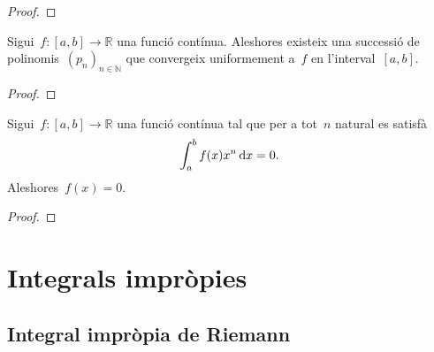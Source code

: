 \documentclass[../../main.tex]{subfiles}
\begin{document}
    \begin{proof}
    \end{proof}
    \begin{theorem}
        \label{thm:Teorema-daproximacio-polinomica-de-Weierstrass}
        Sigui~\(f\colon[a,b]\longrightarrow\mathbb{R}\) una funció contínua.
        Aleshores existeix una successió de polinomis~\((p_{n})_{n\in\mathbb{N}}\) que convergeix uniformement a~\(f\) en l'interval~\([a,b]\).
    \end{theorem}
    \begin{proof}
    \end{proof}
    \begin{corollary}
        Sigui~\(f\colon[a,b]\longrightarrow\mathbb{R}\) una funció contínua tal que per a tot~\(n\) natural es satisfà
        \[
            \int_{a}^{b}f(x)x^{n}\mathop{}\!\mathrm{d} x=0.
        \]
        Aleshores~\(f(x)=0\).
    \end{corollary}
    \begin{proof}
    \end{proof}
\chapter{Integrals impròpies}
\section{Integral impròpia de Riemann}
\end{document}

